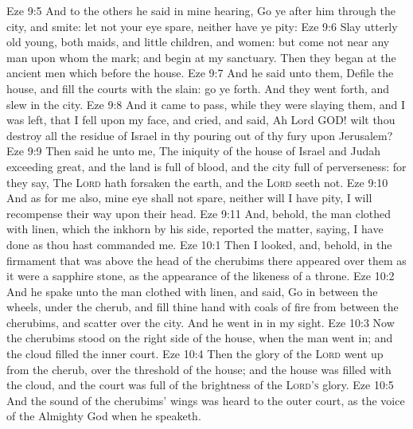 \vs Eze 9:5 And to the others he said in mine hearing, Go ye after him through the city, and smite: let not your eye spare, neither have ye pity:
\vs Eze 9:6 Slay utterly old  young, both maids, and little children, and women: but come not near any man upon whom  the mark; and begin at my sanctuary. Then they began at the ancient men which  before the house.
\vs Eze 9:7 And he said unto them, Defile the house, and fill the courts with the slain: go ye forth. And they went forth, and slew in the city.
\vs Eze 9:8 And it came to pass, while they were slaying them, and I was left, that I fell upon my face, and cried, and said, Ah Lord GOD! wilt thou destroy all the residue of Israel in thy pouring out of thy fury upon Jerusalem?
\vs Eze 9:9 Then said he unto me, The iniquity of the house of Israel and Judah  exceeding great, and the land is full of blood, and the city full of perverseness: for they say, The \textsc{Lord} hath forsaken the earth, and the \textsc{Lord} seeth not.
\vs Eze 9:10 And as for me also, mine eye shall not spare, neither will I have pity,  I will recompense their way upon their head.
\vs Eze 9:11 And, behold, the man clothed with linen, which  the inkhorn by his side, reported the matter, saying, I have done as thou hast commanded me.
\vs Eze 10:1 Then I looked, and, behold, in the firmament that was above the head of the cherubims there appeared over them as it were a sapphire stone, as the appearance of the likeness of a throne.
\vs Eze 10:2 And he spake unto the man clothed with linen, and said, Go in between the wheels,  under the cherub, and fill thine hand with coals of fire from between the cherubims, and scatter  over the city. And he went in in my sight.
\vs Eze 10:3 Now the cherubims stood on the right side of the house, when the man went in; and the cloud filled the inner court.
\vs Eze 10:4 Then the glory of the \textsc{Lord} went up from the cherub,  over the threshold of the house; and the house was filled with the cloud, and the court was full of the brightness of the \textsc{Lord's} glory.
\vs Eze 10:5 And the sound of the cherubims' wings was heard  to the outer court, as the voice of the Almighty God when he speaketh.
